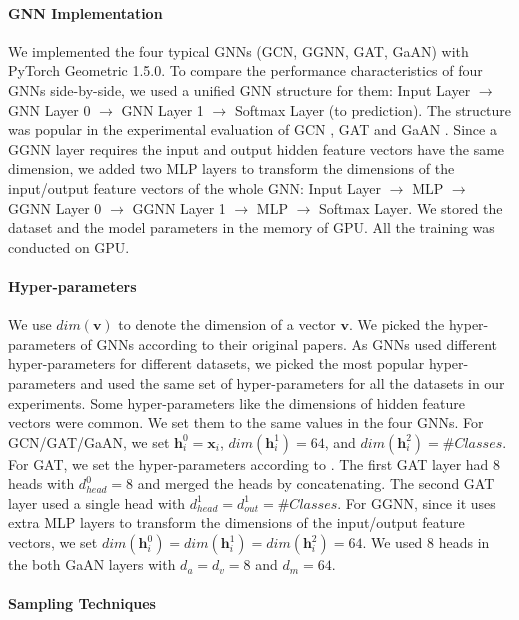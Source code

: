 \paragraph{GNN Implementation}
We implemented the four typical GNNs (GCN, GGNN, GAT, GaAN) with PyTorch Geometric 1.5.0.
To compare the performance characteristics of four GNNs side-by-side, we used a unified GNN structure for them: Input Layer $\rightarrow$ GNN Layer 0 $\rightarrow$ GNN Layer 1 $\rightarrow$ Softmax Layer (to prediction).
The structure was popular in the experimental evaluation of GCN \cite{kipf2017_gcn}, GAT \cite{huang2018_gat} and GaAN \cite{zhang2018_gaan}.
Since a GGNN layer requires the input and output hidden feature vectors have the same dimension, we added two MLP layers to transform the dimensions of the input/output feature vectors of the whole GNN: Input Layer $\rightarrow$ MLP $\rightarrow$ GGNN Layer 0 $\rightarrow$ GGNN Layer 1 $\rightarrow$ MLP $\rightarrow$ Softmax Layer.
We stored the dataset and the model parameters in the memory of GPU.
All the training was conducted on GPU.

\paragraph{Hyper-parameters}
We use $dim(\boldsymbol{v})$ to denote the dimension of a vector $\boldsymbol{v}$.
We picked the hyper-parameters of GNNs according to their original papers.
As GNNs used different hyper-parameters for different datasets, we picked the most popular hyper-parameters and used the same set of hyper-parameters for all the datasets in our experiments.
Some hyper-parameters like the dimensions of hidden feature vectors were common.
We set them to the same values in the four GNNs.
For GCN/GAT/GaAN, we set $\boldsymbol{h}^0_i = \boldsymbol{x}_i$, $dim(\boldsymbol{h}^1_i)=64$, and $dim(\boldsymbol{h}^2_i)=\#Classes$.
For GAT, we set the hyper-parameters according to \cite{huang2018_gat}.
The first GAT layer had 8 heads with $d^0_{head}=8$ and merged the heads by concatenating.
The second GAT layer used a single head with $d^1_{head}=d^1_{out}=\#Classes$.
For GGNN, since it uses extra MLP layers to transform the dimensions of the input/output feature vectors, we set $dim(\boldsymbol{h}^0_i) = dim(\boldsymbol{h}^1_i) = dim(\boldsymbol{h}^2_i) = 64$.
We used 8 heads in the both GaAN layers with $d_a=d_v=8$ and $d_m=64$.

\paragraph{Sampling Techniques}

